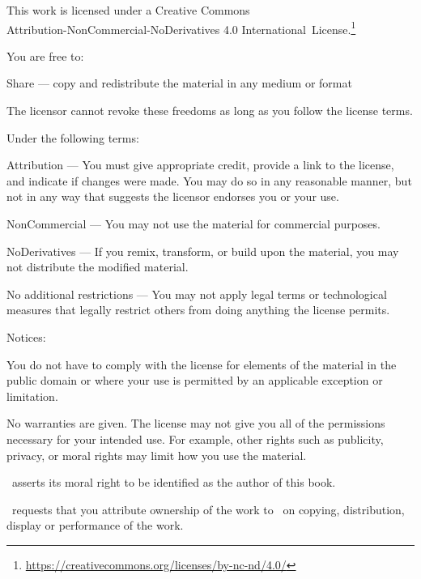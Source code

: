 \cleartorecto
\thispagestyle{copyright}

{\fontsize{8.75}{11}\selectfont\setlength{\parindent}{0pt}%
\raggedright\label{copyright-details}
\setlength{\parskip}{7pt}

{\centering

{\LARGE\ccbyncnd}

This work is licensed under a Creative Commons\\
Attribution-NonCommercial-NoDerivatives 4.0 International~License.\footnote{%
\fontsize{8.75}{11}\selectfont\href{https://creativecommons.org/licenses/by-nc-nd/4.0/}{https://creativecommons.org/licenses/by-nc-nd/4.0/}}

}

You are free to:

\begin{packeditemize}
\item Share — copy and redistribute the material in any medium or format
\end{packeditemize}

The licensor cannot revoke these freedoms as long as you follow the license terms.

Under the following terms:

\begin{packeditemize}
\item Attribution — You must give appropriate credit, provide a link to the license, and indicate if changes were made. You may do so in any reasonable manner, but not in any way that suggests the licensor endorses you or your use.
\item NonCommercial — You may not use the material for commercial purposes.
\item NoDerivatives — If you remix, transform, or build upon the material, you may not distribute the modified material.
\end{packeditemize}

No additional restrictions — You may not apply legal terms or technological measures that legally restrict others from doing anything the license permits.

Notices:

You do not have to comply with the license for elements of the material in the public domain or where your use is permitted by an applicable exception or limitation.

No warranties are given. The license may not give you all of the permissions necessary for your intended use. For example, other rights such as publicity, privacy, or moral rights may limit how you use the material.


\thePublisher\ asserts its moral right to be identified as the author of this book.

\thePublisher\ requests that you attribute ownership of the work to \thePublisher\ on copying, distribution, display or performance of the work.

}
